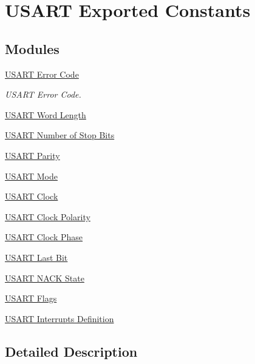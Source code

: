 \hypertarget{group___u_s_a_r_t___exported___constants}{}\section{U\+S\+A\+RT Exported Constants}
\label{group___u_s_a_r_t___exported___constants}
\subsection*{Modules}
\begin{DoxyCompactItemize}
\item 
\hyperlink{group___u_s_a_r_t___error___code}{U\+S\+A\+R\+T Error Code}
\begin{DoxyCompactList}\small\item\em U\+S\+A\+RT Error Code. \end{DoxyCompactList}\item 
\hyperlink{group___u_s_a_r_t___word___length}{U\+S\+A\+R\+T Word Length}
\item 
\hyperlink{group___u_s_a_r_t___stop___bits}{U\+S\+A\+R\+T Number of Stop Bits}
\item 
\hyperlink{group___u_s_a_r_t___parity}{U\+S\+A\+R\+T Parity}
\item 
\hyperlink{group___u_s_a_r_t___mode}{U\+S\+A\+R\+T Mode}
\item 
\hyperlink{group___u_s_a_r_t___clock}{U\+S\+A\+R\+T Clock}
\item 
\hyperlink{group___u_s_a_r_t___clock___polarity}{U\+S\+A\+R\+T Clock Polarity}
\item 
\hyperlink{group___u_s_a_r_t___clock___phase}{U\+S\+A\+R\+T Clock Phase}
\item 
\hyperlink{group___u_s_a_r_t___last___bit}{U\+S\+A\+R\+T Last Bit}
\item 
\hyperlink{group___u_s_a_r_t___n_a_c_k___state}{U\+S\+A\+R\+T N\+A\+C\+K State}
\item 
\hyperlink{group___u_s_a_r_t___flags}{U\+S\+A\+R\+T Flags}
\item 
\hyperlink{group___u_s_a_r_t___interrupt__definition}{U\+S\+A\+R\+T Interrupts Definition}
\end{DoxyCompactItemize}


\subsection{Detailed Description}
